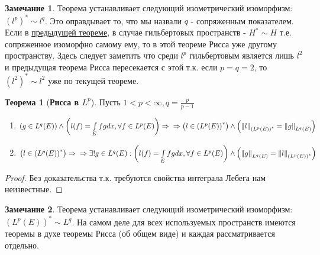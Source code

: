 \documentclass[12pt,a4paper]{article}
\theoremstyle{definition}
\newtheorem{theorem}{Теорема}
\newtheorem{corollaryth}{Замечание}[theorem]
\newcommand{\norm}[1]{\left\lVert#1\right\rVert}
\newcommand{\conj}[1]{\left(#1\right)^*}
\begin{document}
\begin{corollaryth}
	Теорема устанавливает следующий изометрический изоморфизм: $\conj{l^p} \sim l^q$. Это оправдывает то, что мы назвали $q$ - сопряженным показателем. Если в \hyperref[th:Rietz_general]{предыдущей теореме}, в случае гильбертовых пространств - $H^* \sim H$ т.е. сопряженное изоморфно самому ему, то в этой теореме Рисса уже другому пространству. Здесь следует заметить что среди $l^p$ гильбертовым является лишь $l^2$ и предыдущая теорема Рисса пересекается с этой т.к. если $p = q = 2$, то $\conj{l^2} \sim l^2$ уже по текущей теореме.
\end{corollaryth}


\begin{theorem}[\textbf{Рисса в $L^p$}]
	Пусть $1 < p < \infty, q = \frac{p}{p-1}$
	\begin{enumerate}
		\item $(g \in L^q (E)) \wedge \left(l(f) = \int\limits_{E}{fg dx}, \forall f \in L^p (E)\right) \Rightarrow \\ \Rightarrow \left(l \in \conj{L^p (E)}\right) \wedge \left(\norm{l}_{ \conj{L^p (E)} } = \norm{g}_{L^q (E)} \right)$
		\item $\left(l \in \conj{L^p (E)}\right) \Rightarrow \\ \Rightarrow \exists!g \in L^q (E): \left( l(f) = \int\limits_{E}{fg dx}, \forall f \in L^p (E)\right) \wedge \left(\norm{g}_{L^q (E)} = \norm{l}_{\conj{L^p (E)}} \right)$
	\end{enumerate}
\end{theorem}
\begin{proof}
	Без доказательства т.к. требуются свойства интеграла Лебега нам неизвестные.
\end{proof}
\begin{corollaryth}
	Теорема устанавливает следующий изометрический изоморфизм: $\conj{L^p (E)} \sim L^q$. На самом деле для всех используемых пространств имеются теоремы в духе теоремы Рисса (об общем виде) и каждая рассматривается отдельно.
\end{corollaryth}

\newpage
\renewcommand{\listtheoremname}{Список теорем и утверждений}
\listoftheorems[ignoreall, show={theorem,corollary}]
\end{document}
